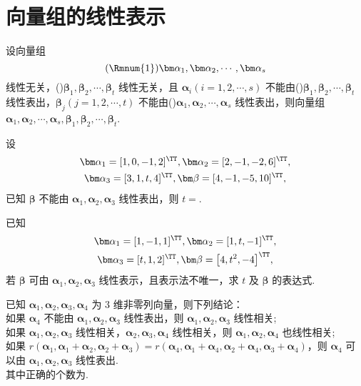 \section{向量组的线性表示}

	\begin{titwo}
		设向量组
		\[
			(\text{\Rmnum{1}})\bm \alpha_{1}, \bm \alpha_{2}, \cdots, \bm \alpha_{s}
		\]
		线性无关，()$\bm \beta_{1}, \bm \beta_{2}, \cdots, \bm \beta_{t}$ 线性无关，且 $\bm \alpha_{i}(i = 1,2,\cdots,s)$ 不能由()$\bm \beta_{1}, \bm \beta_{2}, \cdots, \bm \beta_{t}$ 线性表出，$\bm \beta_{j}(j = 1,2,\cdots,t)$ 不能由()$\bm \alpha_{1}, \bm \alpha_{2}, \cdots, \bm \alpha_{s}$ 线性表出，则向量组 $\bm \alpha_{1}, \bm \alpha_{2}, \cdots, \bm \alpha_{s}, \bm \beta_{1}, \bm \beta_{2}, \cdots, \bm \beta_{t}$\kuo.

	\end{titwo}

	\begin{titwo}
		设
		\begin{gather*}
			\bm \alpha_{1} = [1,0,-1,2]^{\TT}, \bm \alpha_{2} = [2,-1,-2,6]^{\TT},\\
			\bm \alpha_{3} = [3,1,t,4]^{\TT}, \bm \beta = [4,-1,-5,10]^{\TT},
		\end{gather*}
		已知 $\bm \beta$ 不能由 $\bm \alpha_{1}, \bm \alpha_{2}, \bm \alpha_{3}$ 线性表出，则 $t = $\htwo.
	\end{titwo}

	\begin{titwo}
		已知
		\begin{gather*}
			\bm \alpha_{1} = [1,-1,1]^{\TT},\bm \alpha_{2} = [1,t,-1]^{\TT},\\
			\bm \alpha_{3} = [t,1,2]^{\TT},\bm \beta = \bigl[4,t^{2},-4\bigr]^{\TT},
		\end{gather*}
		若 $\bm \beta$ 可由 $\bm \alpha_{1},\bm \alpha_{2},\bm \alpha_{3}$ 线性表示，且表示法不唯一，求 $t$ 及 $\bm \beta$ 的表达式.
	\end{titwo}

	\begin{titwo}
		已知 $\bm \alpha_{1},\bm \alpha_{2},\bm \alpha_{3},\bm \alpha_{4}$ 为 $3$ 维非零列向量，则下列结论：\\
		如果 $\bm \alpha_{4}$ 不能由 $\bm \alpha_{1},\bm \alpha_{2},\bm \alpha_{3}$ 线性表出，则 $\bm \alpha_{1},\bm \alpha_{2},\bm \alpha_{3}$ 线性相关;\\
		如果 $\bm \alpha_{1},\bm \alpha_{2},\bm \alpha_{3}$ 线性相关，$\bm \alpha_{2},\bm \alpha_{3},\bm \alpha_{4}$ 线性相关，则 $\bm \alpha_{1},\bm \alpha_{2},\bm \alpha_{4}$ 也线性相关;\\
		如果 $r(\bm \alpha_{1}, \bm \alpha_{1} + \bm \alpha_{2}, \bm \alpha_{2} + \bm \alpha_{3}) = r(\bm \alpha_{4}, \bm \alpha_{1} + \bm \alpha_{4}, \bm \alpha_{2} + \bm \alpha_{4}, \bm \alpha_{3} + \bm \alpha_{4})$，则 $\bm \alpha_{4}$ 可以由 $\bm \alpha_{1},\bm \alpha_{2},\bm \alpha_{3}$ 线性表出.\\
		其中正确的个数为\kuo.

		\fourch{$0$}{$1$}{$2$}{$3$}
	\end{titwo}

